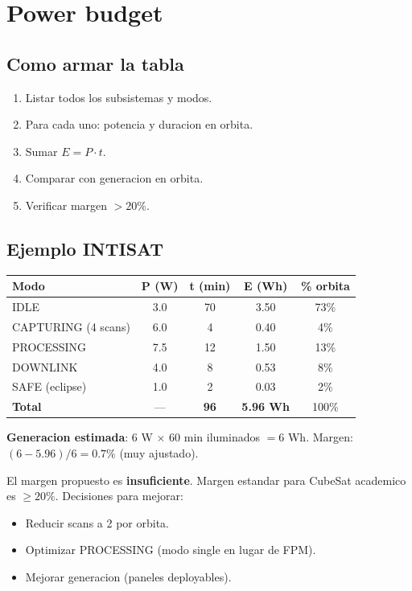 \documentclass[11pt,a4paper,oneside,openright]{book}
\begin{document}
\chapter{Power budget}

\section{Como armar la tabla}

\begin{enumerate}[leftmargin=2em]
  \item Listar todos los subsistemas y modos.
  \item Para cada uno: potencia y duracion en orbita.
  \item Sumar $E = P \cdot t$.
  \item Comparar con generacion en orbita.
  \item Verificar margen $> 20\%$.
\end{enumerate}

\section{Ejemplo INTISAT}

\begin{center}
\small
\begin{tabular}{lcccc}
\toprule
\textbf{Modo} & \textbf{P (W)} & \textbf{t (min)} & \textbf{E (Wh)} & \textbf{\% orbita} \\
\midrule
IDLE                  & 3.0 & 70  & 3.50 & 73\% \\
CAPTURING (4 scans)   & 6.0 & 4   & 0.40 & 4\% \\
PROCESSING            & 7.5 & 12  & 1.50 & 13\% \\
DOWNLINK              & 4.0 & 8   & 0.53 & 8\% \\
SAFE (eclipse)         & 1.0 & 2   & 0.03 & 2\% \\
\midrule
\textbf{Total}        & --- & \textbf{96} & \textbf{5.96 Wh} & 100\% \\
\bottomrule
\end{tabular}
\end{center}

\textbf{Generacion estimada}: 6 W $\times$ 60 min iluminados $= 6$ Wh.
Margen: $(6 - 5.96)/6 = 0.7\%$ (muy ajustado).

\begin{cuidado}
El margen propuesto es \textbf{insuficiente}. Margen estandar para CubeSat
academico es $\geq 20\%$. Decisiones para mejorar:
\begin{itemize}[leftmargin=1em]
  \item Reducir scans a 2 por orbita.
  \item Optimizar PROCESSING (modo single en lugar de FPM).
  \item Mejorar generacion (paneles deployables).
\end{itemize}
\end{cuidado}
\end{document}
